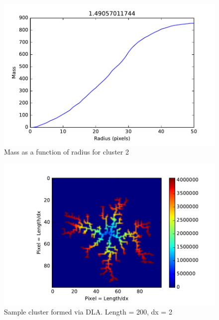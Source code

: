 \documentclass[a4paper]{article}
\begin{document}
\begin{figure}[H]
\centering
\includegraphics[width=.9\linewidth]{Cluster2dim.pdf}
\caption{Mass as a function of radius for cluster 2}
\label{fig:Fractal Dimension Plot for Cluster 2}
\end{figure}


\begin{figure}[H]
\centering
\includegraphics[width=.9\linewidth]{Cluster3.pdf}
\caption{Sample cluster formed via DLA. Length = 200, dx = 2}
\label{fig:Cluster3}
\end{figure}
\end{document}
